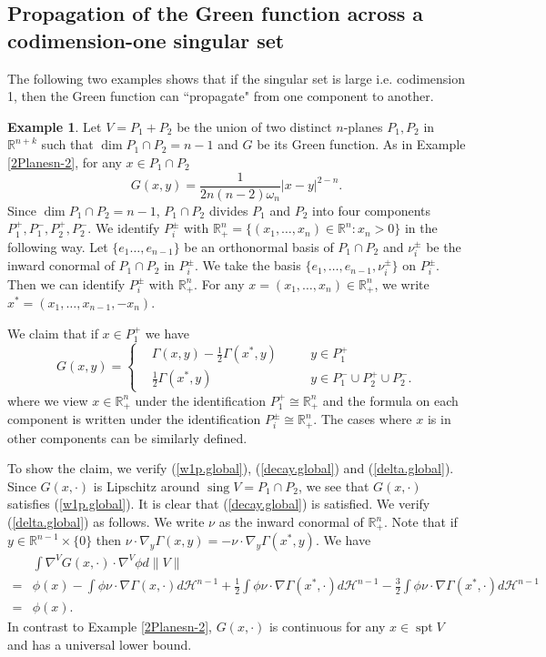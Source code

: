 \documentclass[11pt]{amsart}
\theoremstyle{definition}
\newtheorem{example}[theorem]{Example}
\newcommand{\HH}{\mathcal{H}}
\newcommand{\R}{\mathbb{R}}
\DeclareMathOperator{\spt}{spt}
\DeclareMathOperator{\sing}{sing}
\begin{document}
\subsection{Propagation of the Green function across a codimension-one singular set}
The following two examples shows that if the singular set is large i.e. codimension 1, then the Green function can ``propagate" from one component to another.
\begin{example}\label{2planesn-1}
	Let $V=P_1+P_2$ be the union of two distinct $n$-planes $P_1,P_2$ in $\R^{n+k}$ such that $\dim P_1\cap P_2=n-1$ and $G$ be its Green function. 
	As in Example \ref{2Planesn-2}, for any $x\in P_1\cap P_2$
	\[G(x,y)=\frac{1}{2n(n-2)\omega_n}|x-y|^{2-n}.\]
	Since $\dim P_1\cap P_2=n-1$, $P_1\cap P_2$ divides $P_1$ and $P_2$ into four components $P_{1}^+,P_1^-,P_2^+,P_2^-$. We identify $P_i^\pm$ with $\R^n_+=\{(x_1,\dots,x_n)\in \R^n:x_n>0\}$ in the following way. Let $\{e_1\dots,e_{n-1}\}$ be an orthonormal basis of $P_1\cap P_2$ and $\nu_i^\pm$ be the inward conormal of $P_1\cap P_2$ in $P_i^\pm$. We take the basis $\{e_1,\dots,e_{n-1},\nu_i^\pm\}$ on $P_i^\pm$. Then we can identify $P_i^\pm$ with $\R^n_+$. For any $x=(x_1,\dots,x_n)\in \R^n_+$, we write $x^*=(x_1,\dots,x_{n-1},-x_n)$.
	
	We claim that if $x\in P_1^+$ we have
	\[G(x,y)=\left\{\begin{aligned}
		&\Gamma(x,y)-\frac{1}{2} \Gamma (x^*,y)&\quad& y\in P_1^+\\
		&\frac{1}{2}\Gamma(x^*,y)&\quad&y\in P_1^-\cup P_2^+\cup P_2^- .
	\end{aligned}\right.\]
	where we view $x\in \R^n_+$ under the identification $P_1^+\cong \R^n_+$ and the formula on each component is written under the identification $P_i^\pm\cong \R^n_+$.
	The cases where $x$ is in other components can be similarly defined.
	
	To show the claim, we verify (\ref{w1p.global}), (\ref{decay.global}) and (\ref{delta.global}). Since $G(x,\cdot)$ is Lipschitz around $\sing V=P_1\cap P_2$, we see that $G(x,\cdot)$ satisfies (\ref{w1p.global}). It is clear that (\ref{decay.global}) is satisfied.
	We verify (\ref{delta.global}) as follows. We write $\nu$ as the inward conormal of $\R^n_+$. Note that if $y\in \R^{n-1}\times \{0\}$ then $\nu\cdot\nabla_y\Gamma(x,y)=-\nu\cdot\nabla_y \Gamma(x^*,y)$. We have
	\[\begin{aligned}
		&\int \nabla^V G(x,\cdot)\cdot\nabla^V \phi d\|V\|\\
		=&\phi(x)-\int \phi\nu\cdot \nabla \Gamma(x,\cdot)d\HH^{n-1}+\frac{1}{2}\int \phi\nu\cdot \nabla \Gamma(x^*,\cdot)  d\HH^{n-1}-\frac{3}{2}\int \phi\nu\cdot\nabla \Gamma(x^*,\cdot)  d\HH^{n-1}\\
		=&\phi(x).
	\end{aligned}\]
	In contrast to Example \ref{2Planesn-2}, $G(x,\cdot)$ is continuous for any $x\in \spt V$ and has a universal lower bound.
\end{example}
\end{document}
